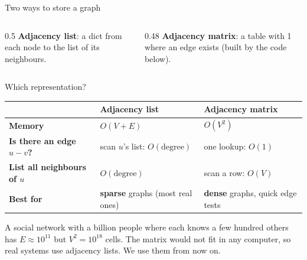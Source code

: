 \documentclass[aspectratio=169,10pt]{beamer}
\begin{document}
\begin{frame}{Two ways to store a graph}
\begin{columns}[T]
\begin{column}{0.5\textwidth}
\vspace{2mm}
\vspace{1mm}
{\small \textbf{Adjacency list}: a dict from each node to the list of its neighbours.}
\end{column}
\begin{column}{0.48\textwidth}
\vspace{1mm}
{\small \textbf{Adjacency matrix}: a table with 1 where an edge exists (built by the code below).}
\vspace{1mm}
\end{column}
\end{columns}
\end{frame}

\begin{frame}{Which representation?}
\renewcommand{\arraystretch}{1.35}\small
\begin{tabular}{@{}>{\raggedright\bfseries}p{46mm}>{\raggedright}p{42mm}>{\raggedright\arraybackslash}p{42mm}@{}}
\toprule
 & Adjacency list & Adjacency matrix\\\midrule
Memory & $O(V+E)$ & $O(V^2)$\\
Is there an edge $u\!-\!v$? & scan $u$'s list: $O(\text{degree})$ & one lookup: $O(1)$\\
List all neighbours of $u$ & $O(\text{degree})$ & scan a row: $O(V)$\\
Best for & \textbf{sparse} graphs (most real ones) & \textbf{dense} graphs, quick edge tests\\
\bottomrule
\end{tabular}
\vspace{4mm}

{\small A social network with a billion people where each knows a few hundred others has $E\approx 10^{11}$ but $V^2=10^{18}$ cells. The matrix would not fit in any computer, so real systems use adjacency lists. We use them from now on.}
\end{frame}
\end{document}
